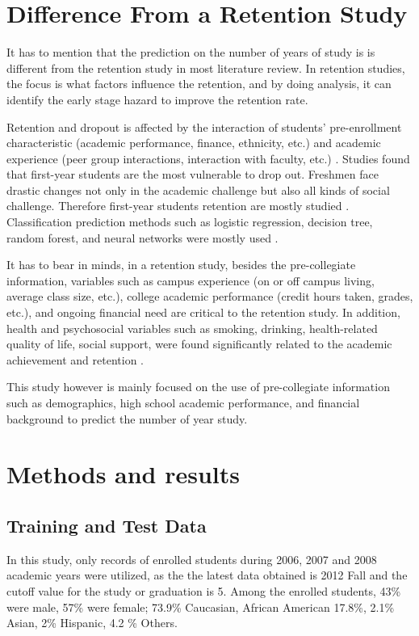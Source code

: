 \documentclass[12pt,english]{report}
\begin{document}
\section{Difference From a Retention Study}
It has to mention that the prediction on the number of years of study is is different from the retention study in most literature review. In retention studies, the focus is what factors influence the retention, and by doing analysis, it can identify the early stage hazard to improve the retention rate. 

Retention and dropout is affected by the interaction of students' pre-enrollment characteristic (academic performance, finance, ethnicity, etc.) and academic experience (peer group interactions, interaction with faculty, etc.) \citep{Tinto1975, Tinto1982, Terenzini1981}. Studies found that first-year students are the most vulnerable to drop out. Freshmen face drastic changes not only in the academic challenge but also all kinds of social challenge. Therefore first-year students retention are mostly studied  \citep{Permzadian2016, Kovacic10earlyprediction, Horstmanshof2007, Noble2007}. Classification prediction methods such as logistic regression, decision tree, random forest, and neural networks were mostly used \citep{dekker2009, AdamGaither2005, quadri2010drop, yu2010data, Herzog2006, Lin2009,zhang2010using, Herzog2006}.

It has to bear in minds, in a retention study, besides the pre-collegiate information, variables such as campus experience (on or off campus living, average class size, etc.), college academic performance (credit hours taken, grades, etc.), and ongoing financial need are critical to the retention study.  In addition, health and psychosocial variables such as smoking, drinking, health-related quality of life, social support, were found significantly related to the academic achievement and retention \citep{deberard2004predictors, maney1990predicting, musgrave1997personality, cutrona1994perceived}. 

This study however is mainly focused on the use of pre-collegiate information such as demographics, high school academic performance, and financial background to predict the number of year study.  

\section{Methods and results}
\subsection{Training and Test Data}
In this study, only records of enrolled students  during 2006, 2007 and 2008 academic years were utilized, as the the latest data obtained is 2012 Fall and the cutoff value for the study or graduation is 5.   Among the enrolled students, 43\% were male, 57\% were female;  73.9\% Caucasian, African American 17.8\%,  2.1\% Asian, 2\% Hispanic, 4.2 \% Others. 
\end{document}
